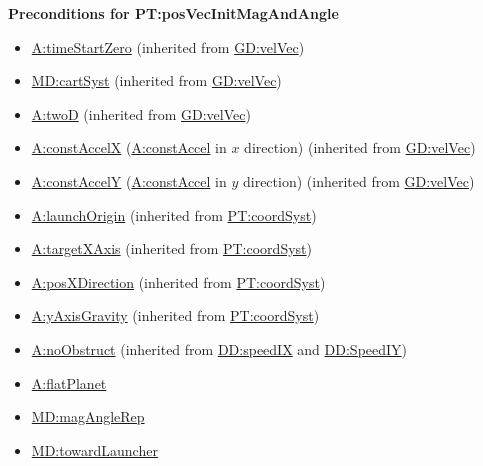 \documentclass[12pt]{article}
\begin{document}
\noindent \textbf{Preconditions for PT:posVecInitMagAndAngle}
\begin{itemize}
\item \hyperref[timeStartZero]{A:timeStartZero} (inherited from \hyperref[GD:velVec]{GD:velVec})
\item \hyperref[MD:cartSyst]{MD:cartSyst} (inherited from \hyperref[GD:velVec]{GD:velVec})
\item \hyperref[twoD]{A:twoD} (inherited from \hyperref[GD:velVec]{GD:velVec})
\item \hyperref[constAccelX]{A:constAccelX} (\hyperref[constAccel]{A:constAccel}
in $x$ direction) (inherited from \hyperref[GD:velVec]{GD:velVec})
\item \hyperref[constAccelY]{A:constAccelY} (\hyperref[constAccel]{A:constAccel}
in $y$ direction) (inherited from \hyperref[GD:velVec]{GD:velVec})
\item \hyperref[launchOrigin]{A:launchOrigin} (inherited from \hyperref[PT:coordSyst]{PT:coordSyst})
\item \hyperref[targetXAxis]{A:targetXAxis} (inherited from \hyperref[PT:coordSyst]{PT:coordSyst})
\item \hyperref[posXDirection]{A:posXDirection} (inherited from \hyperref[PT:coordSyst]{PT:coordSyst})
\item \hyperref[yAxisGravity]{A:yAxisGravity} (inherited from \hyperref[PT:coordSyst]{PT:coordSyst})
\item \hyperref[noObstruct]{A:noObstruct} (inherited from \hyperref[DD:speedIX]{DD:speedIX} and \hyperref[DD:SpeedIY]{DD:SpeedIY})
\item \hyperref[flatPlanet]{A:flatPlanet}
\item \hyperref[MD:magAngleRep]{MD:magAngleRep}
\item \hyperref[MD:towardLauncher]{MD:towardLauncher}
\end{itemize}
\end{document}

